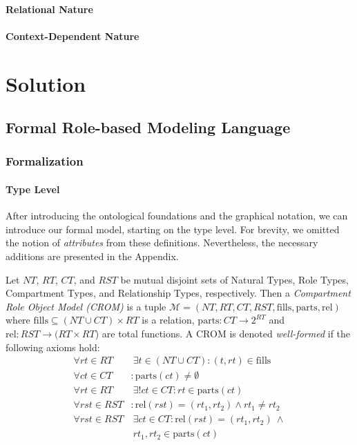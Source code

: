 \documentclass[english,ngerman,BCOR=6mm,cdgeometry=no,DIV=13,twoside,cdmath=false]{tudscrreprt}
\begin{document}
\subsection{Relational Nature}\label{relational-nature}

\blindtext

\subsection{Context-Dependent Nature}\label{context-dependent-nature}

\part{Solution}

\chapter{Formal Role-based Modeling
Language}\label{formal-role-based-modeling-language}

\section{Formalization}\label{formalization}

\subsection{Type Level}\label{type-level}

After introducing the ontological foundations and the graphical
notation, we can introduce our formal model, starting on the type level.
For brevity, we omitted the notion of \emph{attributes} from these
definitions. Nevertheless, the necessary additions are presented in the
Appendix.

\begin{definition}
Let $NT$, $RT$, $CT$, and $RST$ be mutual disjoint sets of 
Natural Types, Role Types, Compartment Types, and Relationship Types, respectively.
Then a \emph{Compartment Role Object Model (CROM)} is a tuple $\mathcal{M}=(NT, RT, CT,RST,\text{fills}, \text{parts}, \text{rel})$ where
$\text{fills} \subseteq (NT \cup CT) \times RT$ is a relation,
$\text{parts} : CT \rightarrow 2^{RT} $ and
$\text{rel} : RST \rightarrow (RT \times RT$) are total functions.
A CROM is denoted \emph{well-formed} if the following axioms hold:
\begin{align}
\forall rt \in RT   &\ \exists t \in (NT \cup CT) : (t,rt) \in \text{fills}\\
\forall ct \in CT   &: \text{parts}(ct) \neq \emptyset\\
\forall rt \in RT   &\ \exists ! ct \in CT : rt \in \text{parts}(ct)\\
\forall rst \in RST &: \text{rel}(rst) = (rt_1,rt_2) \wedge rt_1 \neq rt_2\\
\forall rst \in RST &\ \exists ct \in CT : \text{rel}(rst) = (rt_1,rt_2)\ \wedge\nonumber\\
                    &\ rt_1,rt_2 \in \text{parts}(ct)
\end{align} 
\end{definition}
\end{document}
